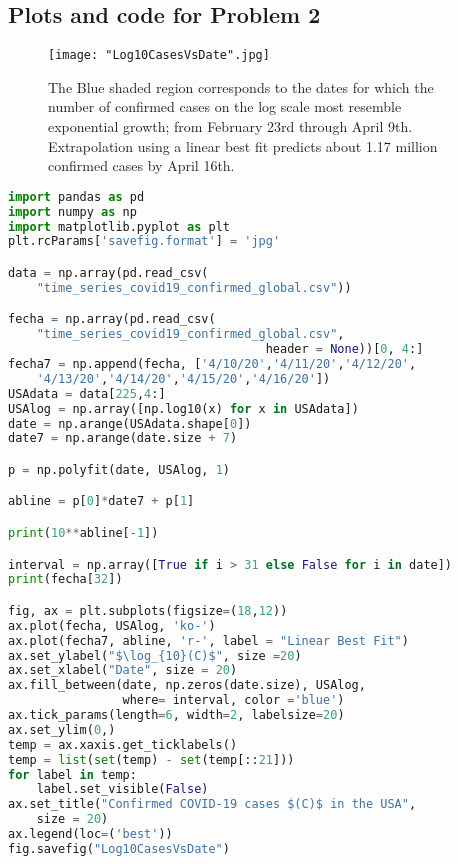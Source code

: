\documentclass[12pt]{article}
\begin{document}
\subsection*{Plots and code for Problem 2}
\begin{figure}[h]
\centering
\texttt{[image: "Log10CasesVsDate".jpg]}
\caption{The Blue shaded region corresponds to the dates for which the number of confirmed cases on the log scale most resemble exponential growth; from February 23rd through April 9th. Extrapolation using a linear best fit predicts about 1.17 million confirmed cases by April 16th.}
\end{figure}
\pagebreak
\begin{lstlisting}[language=python]
import pandas as pd
import numpy as np
import matplotlib.pyplot as plt
plt.rcParams['savefig.format'] = 'jpg'

data = np.array(pd.read_csv(
	"time_series_covid19_confirmed_global.csv"))

fecha = np.array(pd.read_csv(
	"time_series_covid19_confirmed_global.csv", 
									header = None))[0, 4:]
fecha7 = np.append(fecha, ['4/10/20','4/11/20','4/12/20',
	'4/13/20','4/14/20','4/15/20','4/16/20'])
USAdata = data[225,4:]
USAlog = np.array([np.log10(x) for x in USAdata])
date = np.arange(USAdata.shape[0])
date7 = np.arange(date.size + 7)

p = np.polyfit(date, USAlog, 1)

abline = p[0]*date7 + p[1]

print(10**abline[-1])

interval = np.array([True if i > 31 else False for i in date])
print(fecha[32])

fig, ax = plt.subplots(figsize=(18,12))
ax.plot(fecha, USAlog, 'ko-')
ax.plot(fecha7, abline, 'r-', label = "Linear Best Fit")
ax.set_ylabel("$\log_{10}(C)$", size =20)
ax.set_xlabel("Date", size = 20)
ax.fill_between(date, np.zeros(date.size), USAlog,
				where= interval, color ='blue')
ax.tick_params(length=6, width=2, labelsize=20)
ax.set_ylim(0,)
temp = ax.xaxis.get_ticklabels()
temp = list(set(temp) - set(temp[::21]))
for label in temp:
	label.set_visible(False)
ax.set_title("Confirmed COVID-19 cases $(C)$ in the USA",
 	size = 20)
ax.legend(loc=('best'))
fig.savefig("Log10CasesVsDate")
\end{lstlisting}
\end{document}
